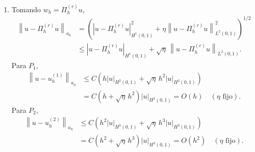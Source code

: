 \documentclass[11pt]{article}
\newcommand{\norm}[1]{\left\lVert #1\right\rVert}
\begin{document}
\begin{enumerate}[label=\textbf{\arabic*.}, leftmargin=*]
\begin{enumerate}[label=(\alph*)]
        \item Tomando $w_h=\Pi_h^{(r)}u$,
        \[
        \begin{aligned}
            \norm{u-\Pi_h^{(r)}u}_{a_\eta}
            &=
            \left(
            |u-\Pi_h^{(r)}u|_{H^1(0,1)}^2
            +\eta\norm{u-\Pi_h^{(r)}u}_{L^2(0,1)}^2
            \right)^{1/2}\\
            &\le
            |u-\Pi_h^{(r)}u|_{H^1(0,1)}
            +\sqrt\eta\,\norm{u-\Pi_h^{(r)}u}_{L^2(0,1)}.
        \end{aligned}
        \]
        Para $P_1$,
        \[
        \begin{aligned}
            \norm{u-u_h^{(1)}}_{a_\eta}
            &\le
            C\left(h|u|_{H^2(0,1)}
            +\sqrt\eta\,h^2|u|_{H^2(0,1)}\right)\\
            &=
            C\left(h+\sqrt\eta\,h^2\right)|u|_{H^2(0,1)}
            =
            O(h)
            \quad(\eta\text{ fijo}).
        \end{aligned}
        \]
        Para $P_2$,
        \[
        \begin{aligned}
            \norm{u-u_h^{(2)}}_{a_\eta}
            &\le
            C\left(h^2|u|_{H^3(0,1)}
            +\sqrt\eta\,h^3|u|_{H^3(0,1)}\right)\\
            &=
            C\left(h^2+\sqrt\eta\,h^3\right)|u|_{H^3(0,1)}
            =
            O(h^2)
            \quad(\eta\text{ fijo}).
        \end{aligned}
        \]


\end{enumerate}
\end{enumerate}
\end{document}
